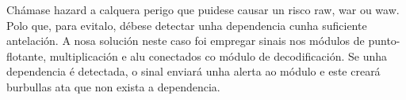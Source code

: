 Chámase hazard a calquera perigo que puidese causar un risco \acrfull{raw}, \acrfull{war} ou \acrfull{waw}. Polo que, para evitalo, débese detectar unha dependencia cunha suficiente antelación. A nosa solución neste caso foi empregar sinais nos módulos de punto-flotante, multiplicación e \acrshort{alu} conectados co módulo de decodificación. Se unha dependencia é detectada, o sinal enviará unha alerta ao módulo e este creará burbullas ata que non exista a dependencia.